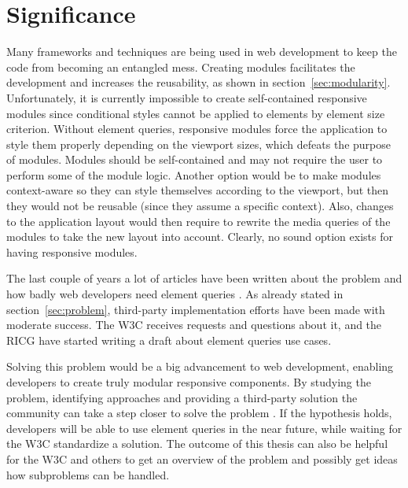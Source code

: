 \documentclass[a4paper,11pt]{kth-mag}
\begin{document}
    \section{Significance}
      Many frameworks and techniques are being used in \gls{web} development to keep the code from becoming an entangled mess.
      Creating modules facilitates the development and increases the reusability, as shown in section~\ref{sec:modularity}.
      Unfortunately, it is currently impossible to create \gls{self-contained} \gls{responsive} modules since conditional styles cannot be applied to \glspl{element} by \gls{element} size criterion.
      Without element queries, \gls{responsive} modules force the application to style them properly depending on the \gls{viewport} sizes, which defeats the purpose of modules.
      Modules should be \gls{self-contained} and may not require the user to perform some of the module logic.
      Another option would be to make modules context-aware so they can style themselves according to the \gls{viewport}, but then they would not be reusable (since they assume a specific context).
      Also, changes to the application layout would then require to rewrite the \gls{media queries} of the modules to take the new layout into account.
      Clearly, no sound option exists for having \gls{responsive} modules.

      The last couple of years a lot of articles have been written about the problem and how badly \gls{web} developers need element queries \cite{eq_article_localised-css,eq_article_backalley,eq_article_mqhack,eq_article_tabatkjr,eq_article_filament,eq_article_tyson,eq_article_neal,eq_article_css-tricks,eq_article_hugo,eq_article_fremycompany,eq_article_discource,eq_article_matt}.
      As already stated in section~\ref{sec:problem}, \gls{third-party} implementation efforts have been made with moderate success.
      The \gls{W3C} receives requests and questions about it, and the \gls{RICG} have started writing a draft \cite{ricg_draft} about element queries use cases.

      Solving this problem would be a big advancement to \gls{web} development, enabling developers to create truly modular \gls{responsive} components.
      By studying the problem, identifying approaches and providing a \gls{third-party} solution the community can take a step closer to solve the problem .
      If the hypothesis holds, developers will be able to use element queries in the near future, while waiting for the \gls{W3C} standardize a solution. 
      The outcome of this thesis can also be helpful for the \gls{W3C} and others to get an overview of the problem and possibly get ideas how subproblems can be handled.
\end{document}
